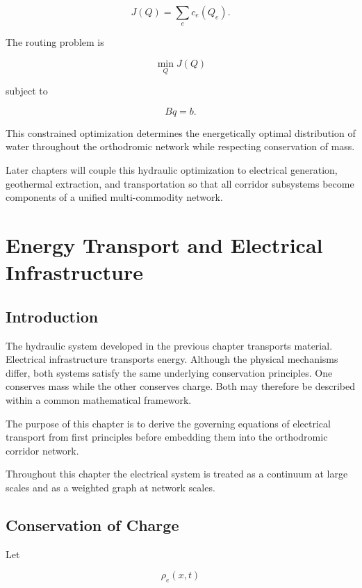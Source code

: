\documentclass[11pt,fleqn]{book}
\numberwithin{equation}{chapter}
\theoremstyle{plain}
\theoremstyle{definition}
\theoremstyle{remark}
\begin{document}
\[
J(Q)
=
\sum_e
c_e(Q_e).
\]

The routing problem is

\[
\min_Q
J(Q)
\]

subject to

\[
Bq=b.
\]


This constrained optimization determines the energetically optimal
distribution of water throughout the orthodromic network while
respecting conservation of mass.

Later chapters will couple this hydraulic optimization to electrical
generation, geothermal extraction, and transportation so that all
corridor subsystems become components of a unified multi-commodity
network.

\chapter{Energy Transport and Electrical Infrastructure}

\section{Introduction}

The hydraulic system developed in the previous chapter transports
material. Electrical infrastructure transports energy. Although the
physical mechanisms differ, both systems satisfy the same underlying
conservation principles. One conserves mass while the other conserves
charge. Both may therefore be described within a common mathematical
framework.

The purpose of this chapter is to derive the governing equations of
electrical transport from first principles before embedding them into
the orthodromic corridor network.

Throughout this chapter the electrical system is treated as a continuum
at large scales and as a weighted graph at network scales.


\section{Conservation of Charge}

Let

\[
\rho_e(x,t)
\]
\end{document}

